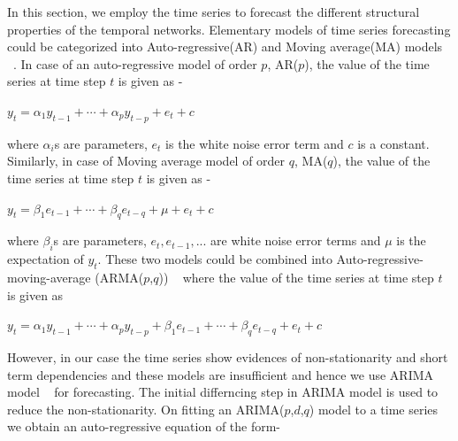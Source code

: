 %  
%  
  
In this section, we employ the time series to forecast the different structural properties of the temporal networks.
Elementary models of time series forecasting could be categorized into Auto-regressive(AR) and Moving average(MA) models ~\cite{chatfield2013analysis}. In case of 
an auto-regressive model of order $p$, AR($p$), the value of the time series at time step $t$ is given as - 
\begin{center}
 $y_{t}=\alpha_{1}y_{t-1}+\cdots+\alpha_{p}y_{t-p}+e_t+c$
\end{center}
where $\alpha_{i}$s are parameters, $e_t$ is the white noise error term and $c$ is a constant.
Similarly, in case of Moving average model of order $q$, MA($q$), the value of the time series at time step $t$ is given as - 
\begin{center}
 $y_{t}=\beta_{1}e_{t-1}+\cdots+\beta_{q}e_{t-q}+\mu+e_t+c$
\end{center}
where $\beta_{i}$s are parameters, $e_t,e_{t-1},...$ are white noise error terms and $\mu$ is the expectation of $y_t$.
These two models could be combined into Auto-regressive-moving-average (ARMA($p$,$q$)) ~\cite{chatfield2013analysis} where the value of the time series at time step $t$ is given as
\begin{center}
 $y_{t}=\alpha_{1}y_{t-1}+\cdots+\alpha_{p}y_{t-p}+\beta_{1}e_{t-1}+\cdots+\beta_{q}e_{t-q}+e_t+c$
\end{center}

However, in our case the time series show evidences of non-stationarity and short term dependencies and these models are insufficient and hence we use ARIMA model ~\cite{box2011time} for forecasting. The initial differncing step in ARIMA model 
is used to reduce the non-stationarity.
On fitting an ARIMA($p$,$d$,$q$) model to a time series we obtain an auto-regressive 
equation of the form-

